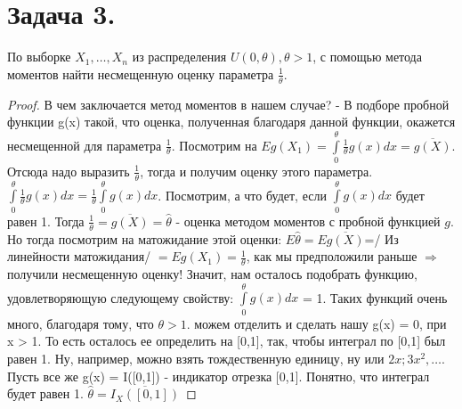 \documentclass{article}
\theoremstyle{plain}
\theoremstyle{definition}
\begin{document}
\section{Задача 3.}
По выборке $X_1, \dots , X_n$ из распределения $U(0, \theta), \theta > 1$, с помощью метода моментов найти несмещенную оценку параметра $\frac{1}{\theta}$.
\begin{proof}
	В чем заключается метод моментов в нашем случае? - В подборе пробной функции g(x) такой, что оценка, полученная благодаря данной функции, окажется несмещенной для параметра $\frac{1}{\theta}$. Посмотрим на $Eg(X_1) = \int\limits_0^{\theta} \frac{1}{\theta} g(x) dx = \overline{g(X)}$. Отсюда надо выразить $\frac{1}{\theta}$, тогда и получим оценку этого параметра. $\int\limits_0^{\theta} \frac{1}{\theta} g(x) dx = \frac{1}{\theta}\int\limits_0^{\theta}  g(x) dx$. Посмотрим, а что будет, если $\int\limits_0^{\theta}  g(x) dx$ будет равен 1. Тогда $\frac{1}{\theta} = \overline{g(X)} = \hat{\theta}$ - оценка методом моментов с пробной функцией $g$. Но тогда посмотрим на матожидание этой оценки: $E\hat{\theta} = E\overline{g(X)}$=/ Из линейности матожидания/  $= Eg(X_1) = \frac{1}{\theta}$, как мы предположили раньше $\Rightarrow$ получили несмещенную оценку! Значит, нам осталось подобрать функцию, удовлетворяющую следующему свойству: $\int\limits_0^{\theta}  g(x) dx$ = 1. Таких функций очень много, благодаря тому, что $\theta > 1$. можем отделить и сделать нашу g(x) = 0, при x > 1. То есть осталось ее определить на [0,1], так, чтобы интеграл по [0,1] был равен 1. Ну, например, можно взять тождественную единицу, ну или $2x; 3x^2, \dots$. Пусть все же g(x) = I([0,1]) - индикатор отрезка [0,1]. Понятно, что интеграл будет равен 1. $\hat{\theta} = \overline{I_X([0, 1])}$
\end{proof}	
\end{document}
